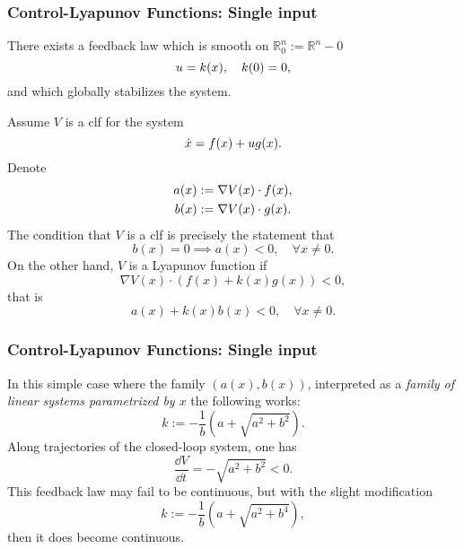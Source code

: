 \begin{frame}
    \frametitle{Control-Lyapunov Functions: Single input}
    There exists a feedback law which is smooth on $\mathbb{R}_0^n :=
    \mathbb{R}^n - 0$
    \vspace{-1mm}
    \begin{equation*}
        u = k(x), \quad k(0) = 0,
        \vspace{-1mm}
    \end{equation*}
    and which globally stabilizes the system.

    Assume $V$ is a clf for the system
    \vspace{-1mm}\[ \dot{x} = f(x) + u g(x) \vspace{-1mm}. \] Denote
    \vspace{-3mm}
    \begin{align*}
        a(x) &:= \nabla V(x) \cdot f(x), \\
        b(x) &:= \nabla V(x) \cdot g(x).
        \vspace{-3mm}
    \end{align*}
    The condition that $V$ is a clf is precisely the statement that 
    \[ b(x) = 0 \implies a(x) < 0, \quad \forall x \neq 0. \] On the other hand,
    $V$ is a Lyapunov function if \vspace{-1mm}\[ \nabla V(x) \cdot \left( f(x)
    + k(x)g(x) \right) < 0, \] that is \[ a(x) + k(x) b(x) < 0, \quad \forall x
    \neq 0. \]
\end{frame}


\begin{frame}
    \frametitle{Control-Lyapunov Functions: Single input}

    In this simple case where the family $\left( a(x), b(x) \right)$,
    interpreted as a \textit{family of linear systems parametrized by $x$} the
    following works: \[ k := -\frac{1}{b}\left( a + \sqrt{a^2 +
    b^2} \right). \] Along trajectories of the closed-loop system, one has 
    \[ \frac{\dd V}{\dd t} = -\sqrt{a^2 + b^2} < 0. \] This feedback law may
    fail to be continuous, but with the slight modification \[ k :=
    -\frac{1}{b}\left( a + \sqrt{a^2+b^4} \right), \] then it does become
    continuous.
\end{frame}


